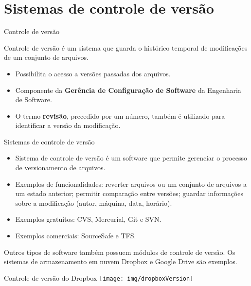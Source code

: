 \documentclass[a4paper]{beamer}
\begin{document}
\section{Sistemas de controle de versão}

\begin{frame}{Controle de versão}

Controle de versão é um sistema que guarda o histórico temporal de modificações de um conjunto de arquivos.

\begin{itemize}
\item Possibilita o acesso a versões passadas dos arquivos.
\item Componente da \textbf{Gerência de Configuração de Software} da Engenharia de Software.
\item O termo \textbf{revisão}, precedido por um número, também é utilizado para identificar a versão da modificação.
\end{itemize}

\end{frame}

\begin{frame}{Sistemas de controle de versão}

\begin{itemize}
\item Sistema de controle de versão é um software que permite gerenciar o processo de versionamento de arquivos.
\item Exemplos de funcionalidades: reverter arquivos ou um conjunto de arquivos a um estado anterior; permitir comparação entre versões; guardar informações sobre a modificação (autor, máquina, data, horário).
\item Exemplos gratuitos: CVS, Mercurial, Git e SVN.
\item Exemplos comerciais: SourceSafe e TFS.
\end{itemize}
\pause

\begin{block}{}
Outros tipos de software também possuem módulos de controle de versão. Os sistemas de armazenamento em nuvem Dropbox e Google Drive são exemplos.
\end{block}

\end{frame}

\begin{frame}{Controle de versão do Dropbox}
\texttt{[image: img/dropboxVersion]}
\end{frame}
\end{document}

